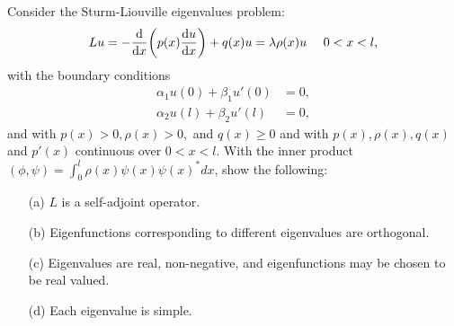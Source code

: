 \documentclass[12pt]{report}
\begin{document}
\begin{problem}
    Consider the Sturm-Liouville eigenvalues problem:
    \[ 
        Lu = - \frac{\mathrm{d} }{\mathrm{d} x}{\left(p(x)\frac{\mathrm{d} u}{\mathrm{d} x}\right)} + q(x)u = \lambda\rho(x)u ~~~~ 0 < x < l,
    \]
    with the boundary conditions
    \begin{align*}
        \alpha_1 u(0) + \beta_1 u'(0) &= 0,\\
        \alpha_2 u(l) + \beta_2 u'(l) &= 0,
    \end{align*}
    and  with $p(x) > 0, \rho(x) > 0,$ and $q(x) \geq 0$ and with $p(x), \rho(x), q(x)$ and $p'(x)$ continuous over $0 < x < l$. With the inner product $(\phi,\psi) = \int_0^l\rho(x)\psi(x)\psi(x)^*dx$, show the following:
    \begin{enumerate}
        \item [(a)] $L$ is a self-adjoint operator. 
        \item [(b)] Eigenfunctions corresponding to different eigenvalues are orthogonal. 
        \item [(c)] Eigenvalues are real, non-negative, and eigenfunctions may be chosen to be real valued. 
        \item [(d)] Each eigenvalue is simple. 
    \end{enumerate}
\end{problem}
\end{document}
